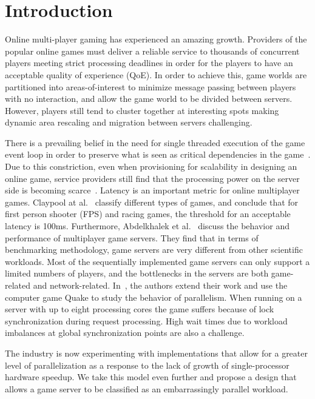 \section{Introduction}

Online multi-player gaming has experienced an amazing growth. Providers of the
popular online games must deliver a reliable service to thousands of concurrent
players meeting strict processing deadlines in order for the players to have an
acceptable quality of experience (QoE). In order to achieve this, game worlds are
partitioned into areas-of-interest to minimize message passing between players
with no interaction, and allow the game world to be divided between servers.
However, players still tend to cluster together at interesting spots making
dynamic area rescaling and migration between servers challenging.

There is a prevailing belief in the need for single threaded execution of the
game event loop in order to preserve what is seen as critical dependencies in
the game~\cite{Abdelkhalek2004++}. Due to this constriction, even when
provisioning for scalability in designing an online game, service providers
still find that the processing power on the server side is becoming scarce~\cite{Cai2002++}.
Latency is an important metric for online multiplayer games.
Claypool at al.~\cite{claypool++-2006} classify different types of games, and
conclude that for first person shooter (FPS) and racing games, the threshold for
an acceptable latency is 100ms. Furthermore, Abdelkhalek et al.~\cite{Abdelkhalek2003++}
discuss the behavior and performance of multiplayer game
servers. They find that in terms of benchmarking methodology, game servers are
very different from other scientific workloads. Most of the sequentially
implemented game servers can only support a limited numbers of players, and the
bottlenecks in the servers are both game-related and network-related. 
In~\cite{Abdelkhalek2004++}, the authors extend their work and use the computer game
Quake to study the behavior of parallelism. When running on a server with up to
eight processing cores the game suffers because of lock synchronization during
request processing. High wait times due to workload imbalances at global
synchronization points are also a challenge.

The industry is now experimenting with implementations that allow for
a greater level of parallelization as a response to the lack of growth
of single-processor hardware speedup. We take this model even further
and propose a design that allows a game server to be classified as an
embarrassingly parallel workload.

